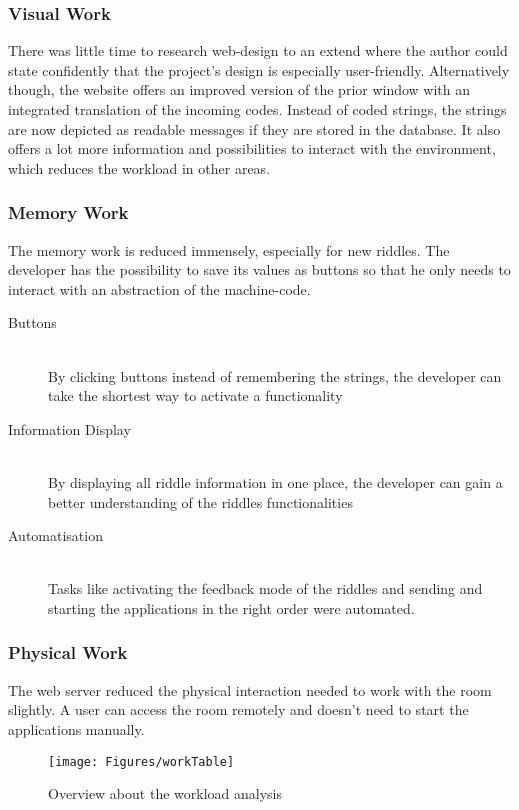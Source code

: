 \subsubsection{Visual Work}
There was little time to research web-design to an extend where the author could state confidently that the project's design is especially user-friendly.
Alternatively though, the website offers an improved version of the prior window with an integrated translation of the incoming codes.
Instead of coded strings, the strings are now depicted as readable messages if they are stored in the database.
It also offers a lot more information and possibilities to interact with the environment, which reduces the workload in other areas.
\subsubsection{Memory Work}
The memory work is reduced immensely, especially for new riddles. 
The developer has the possibility to save its values as buttons so that he only needs to interact with an abstraction of the machine-code.
\begin{description}
    \item [Buttons] \hfill \\
    By clicking buttons instead of remembering the strings, the developer can take the shortest way to activate a functionality
    \item [Information Display] \hfill \\
    By displaying all riddle information in one place, the developer can gain a better understanding of the riddles functionalities
    \item [Automatisation] \hfill \\
    Tasks like activating the feedback mode of the riddles and sending 
    and starting the applications in the right order were automated.
\end{description}
\subsubsection{Physical Work}
The web server reduced the physical interaction needed to work with the room  slightly. 
A user can access the room remotely and doesn't need to start the applications manually.

\begin{figure}[th]
	\centering
	\texttt{[image: Figures/workTable]}
	\decoRule
	\caption[Workload Overview]{Overview about the workload analysis}
	\label{fig:TableWork}
\end{figure}

